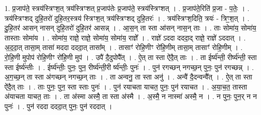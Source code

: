 \documentclass[17pt]{extarticle}
\begin{document}
1. प्र॒जाप॑ते॒ स्त्रय॑स्त्रिꣳश॒त् त्रय॑स्त्रिꣳशत् प्र॒जाप॑तेः प्र॒जाप॑ते॒ स्त्रय॑स्त्रिꣳशत् । . प्र॒जाप॑ते॒रिति॑ प्र॒जा - प॒तेः॒ । . त्रय॑स्त्रिꣳशद् दुहि॒तरो॑ दुहि॒तर॒स्त्रय॑ स्त्रिꣳश॒त् त्रय॑स्त्रिꣳशद् दुहि॒तरः॑ । . त्रय॑स्त्रिꣳश॒दिति॒ त्रयः॑ - त्रिꣳ॒॒श॒त् । . दु॒हि॒तर॑ आसन् नासन् दुहि॒तरो॑ दुहि॒तर॑ आसन्न् । . आ॒स॒न् ता स्ता आ॑सन् नास॒न् ताः । . ताः सोमा॑य॒ सोमा॑य॒ तास्ताः सोमा॑य । . सोमा॑य॒ राज्ञे॒ राज्ञे॒ सोमा॑य॒ सोमा॑य॒ राज्ञे᳚ । . राज्ञे॑ ऽददा दददा॒द् राज्ञे॒ राज्ञे॑ ऽददात् । . अ॒द॒दा॒त् तासा॒म् तासा॑ मददा दददा॒त् तासा᳚म् । . तासाꣳ॑ रोहि॒णीꣳ रो॑हि॒णीम् तासा॒म् तासाꣳ॑ रोहि॒णीम् । . रो॒हि॒णी मुपोप॑ रोहि॒णीꣳ रो॑हि॒णी मुप॑ । . उपै॑ दै॒दुपोपै᳚त् । . ऐ॒त् ता स्ता ऐ॑दै॒त् ताः । . ता ईर्ष्य॑न्ती॒ रीर्ष्य॑न्ती॒ स्ता स्ता ईर्ष्य॑न्तीः । . ईर्ष्य॑न्तीः॒ पुनः॒ पुन॒ रीर्ष्य॑न्ती॒री र्ष्य॑न्तीः॒ पुनः॑ । . पुन॑ रगच्छन् नगच्छ॒न् पुनः॒ पुन॑ रगच्छन्न् । . अ॒ग॒च्छ॒न् ता स्ता अ॑गच्छन् नगच्छ॒न् ताः । . ता अन्वनु॒ ता स्ता अनु॑ । . अन्वै॑ दै॒दन्वन्वै᳚त् । . ऐ॒त् ता स्ता ऐ॑दै॒त् ताः । . ताः पुनः॒ पुन॒ स्ता स्ताः पुनः॑ । . पुन॑ रयाचता याचत॒ पुनः॒ पुन॑ रयाचत । . अ॒या॒च॒त॒ तास्ता अ॑याचता याचत॒ ताः । . ता अ॑स्मा अस्मै॒ ता स्ता अ॑स्मै । . अ॒स्मै॒ न नास्मा॑ अस्मै॒ न । . न पुनः॒ पुन॒र् न न पुनः॑ । . पुन॑ रददा दददा॒त् पुनः॒ पुन॑ रददात् । \newline
\end{document}
